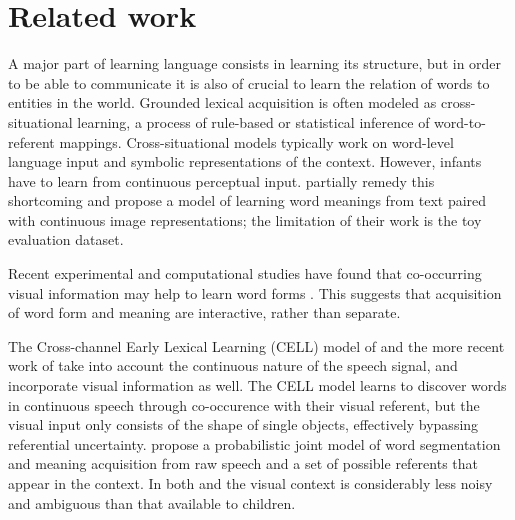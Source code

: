 \section{Related work}
A major part of learning language consists in learning its structure,
but in order to be able to communicate it is also of crucial
to learn the relation of words to entities in the
world.
Grounded lexical acquisition is often modeled as cross-situational
learning, a process of rule-based \cite{siskind.96} or statistical
\cite{fazly.etal.10csj,frank.etal.07} inference of word-to-referent
mappings.
Cross-situational models typically work on word-level language input
and symbolic representations of the context. However, infants have to
learn from continuous perceptual input. 
 partially remedy this shortcoming
and propose a model of learning word
meanings from text paired with continuous image representations; the
limitation of their work is the toy evaluation dataset.

Recent experimental and computational studies have found that co-occurring visual information may help to learn word forms \cite{thiessen2010effects,Cunillera2010295,Glicksohn2013,Yurofsky2012statistical}. This suggests that acquisition of word form and meaning are interactive, rather than separate.

The Cross-channel Early Lexical Learning (CELL) model of  and the more recent work of  take into account the continuous nature of the speech signal, and incorporate visual information as well. The CELL model learns to discover words in continuous speech through co-occurence with their visual referent, but the visual input only consists of the shape of single objects, effectively bypassing referential uncertainty.  propose a probabilistic joint model of word segmentation and meaning acquisition from raw speech and a set of possible referents that appear in the context. In both  and  the visual context is considerably less noisy and ambiguous than that available to children.

